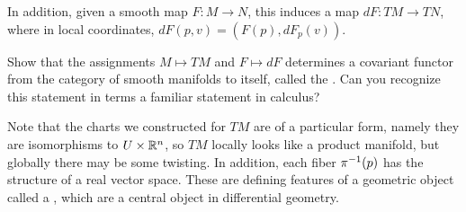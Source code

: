%
In addition, given a smooth map $F : M \to N$, this induces a map
$dF : TM \to TN$, where in local coordinates, $dF(p,v) = (F(p), dF_p(v))$.
%
\begin{exer}
Show that the assignments $M \mapsto TM$ and $F \mapsto dF$ determines
a covariant functor from the category of smooth manifolds to itself,
called the . Can you recognize this statement in
terms a familiar statement in calculus?
\end{exer}
%
Note that the charts we constructed for $TM$ are of a particular form,
namely they are isomorphisms to $U \times \mathbb{R}^n$, so $TM$ locally looks
like a product manifold, but globally there may be some twisting. In
addition, each fiber $\pi^{-1}(p)$ has the structure of a real vector
space. These are defining features of a geometric object called a
, which are a central object in differential geometry.
%
